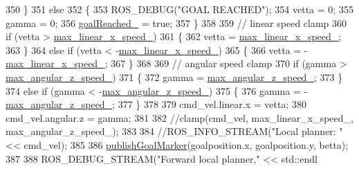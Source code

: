 \begin{DoxyCode}
{350     \}
351     \textcolor{keywordflow}{else}
352     \{
353         ROS\_DEBUG(\textcolor{stringliteral}{"GOAL REACHED"});
354         vetta = 0;
355         gamma = 0;
356         \hyperlink{classcl__move__base__z_1_1forward__local__planner_1_1ForwardLocalPlanner_a9d51ad6f0eb364ebd830526280bdf4fc}{goalReached\_} = \textcolor{keyword}{true};
357     \}
358 
359     \textcolor{comment}{// linear speed clamp}
360     \textcolor{keywordflow}{if} (vetta > \hyperlink{classcl__move__base__z_1_1forward__local__planner_1_1ForwardLocalPlanner_ab2e354dca208a2df60e905c9ee1fcd75}{max\_linear\_x\_speed\_})
361     \{
362         vetta = \hyperlink{classcl__move__base__z_1_1forward__local__planner_1_1ForwardLocalPlanner_ab2e354dca208a2df60e905c9ee1fcd75}{max\_linear\_x\_speed\_};
363     \}
364     \textcolor{keywordflow}{else} \textcolor{keywordflow}{if} (vetta < -\hyperlink{classcl__move__base__z_1_1forward__local__planner_1_1ForwardLocalPlanner_ab2e354dca208a2df60e905c9ee1fcd75}{max\_linear\_x\_speed\_})
365     \{
366         vetta = -\hyperlink{classcl__move__base__z_1_1forward__local__planner_1_1ForwardLocalPlanner_ab2e354dca208a2df60e905c9ee1fcd75}{max\_linear\_x\_speed\_};
367     \}
368 
369     \textcolor{comment}{// angular speed clamp}
370     \textcolor{keywordflow}{if} (gamma > \hyperlink{classcl__move__base__z_1_1forward__local__planner_1_1ForwardLocalPlanner_a198154e40443d46292d8eba1d81ad34f}{max\_angular\_z\_speed\_})
371     \{
372         gamma = \hyperlink{classcl__move__base__z_1_1forward__local__planner_1_1ForwardLocalPlanner_a198154e40443d46292d8eba1d81ad34f}{max\_angular\_z\_speed\_};
373     \}
374     \textcolor{keywordflow}{else} \textcolor{keywordflow}{if} (gamma < -\hyperlink{classcl__move__base__z_1_1forward__local__planner_1_1ForwardLocalPlanner_a198154e40443d46292d8eba1d81ad34f}{max\_angular\_z\_speed\_})
375     \{
376         gamma = -\hyperlink{classcl__move__base__z_1_1forward__local__planner_1_1ForwardLocalPlanner_a198154e40443d46292d8eba1d81ad34f}{max\_angular\_z\_speed\_};
377     \}
378 
379     cmd\_vel.linear.x = vetta;
380     cmd\_vel.angular.z = gamma;
381 
382     \textcolor{comment}{//clamp(cmd\_vel, max\_linear\_x\_speed\_, max\_angular\_z\_speed\_);}
383 
384     \textcolor{comment}{//ROS\_INFO\_STREAM("Local planner: "<< cmd\_vel);}
385 
386     \hyperlink{classcl__move__base__z_1_1forward__local__planner_1_1ForwardLocalPlanner_ae2ef5a1d00495eb7a6c22ec35ab8baf2}{publishGoalMarker}(goalposition.x, goalposition.y, betta);
387 
388     ROS\_DEBUG\_STREAM(\textcolor{stringliteral}{"Forward local planner,"} << std::endl
}
\end{DoxyCode}
